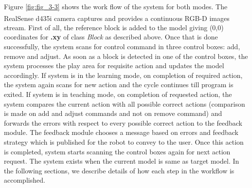Figure \ref{fig:fig_3-3} shows the work flow of the system for both modes. The RealSense\textsuperscript\textregistered{} d435i camera captures and provides a continuous RGB-D images stream. First of all, the reference block is added to the model giving (0,0) coordinates for \textbf{.xy} of class \emph{Block} as described above. Once that is done successfully, the system scans for control command in three control boxes: add, remove and adjust. As soon as a block is detected in one of the control boxes, the system processes the play area for requisite action and updates the model accordingly. If system is in the learning mode, on completion of required action, the system again scans for new action and the cycle continues till program is exited. If system is in teaching mode, on completion of requested action, the system compares the current action with all possible correct actions (comparison is made on add and adjust commands and not on remove command) and forwards the errors with respect to every possible correct action to the feedback module. The feedback module chooses a message based on errors and feedback strategy which is published for the robot to convey to the user. Once this action is completed, system starts scanning the control boxes again for next action request. The system exists when the current model is same as target model. In the following sections, we describe details of how each step in the workflow is accomplished. 
